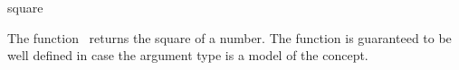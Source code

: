 \begin{ccRefFunction}{square}

\ccDefinition

The function \ccRefName\ returns the square of a number.
The function is guaranteed to be well defined in case the argument type 
is a model of the  concept. 


{}

\ccSeeAlso

\\
\\

\end{ccRefFunction}
